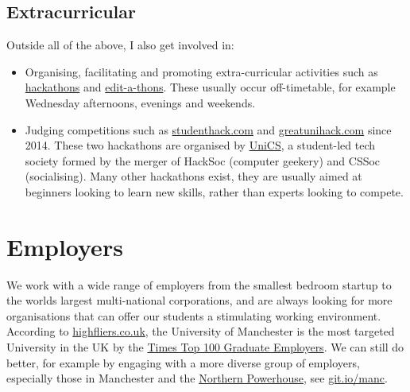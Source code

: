 \documentclass[
  12pt,
]{book}
\providecommand{\tightlist}{%
  \setlength{\itemsep}{0pt}\setlength{\parskip}{0pt}}
\begin{document}
\hypertarget{extracurricular}{%
\section{Extracurricular}\label{extracurricular}}

Outside all of the above, I also get involved in:

\begin{itemize}
\tightlist
\item
  Organising, facilitating and promoting extra-curricular activities such as \href{https://en.wikipedia.org/wiki/Hackathon}{hackathons} \citep{Briscoe, Warner2017} and \href{https://en.wikipedia.org/wiki/Edit-a-thon}{edit-a-thons}. \citep{goodbadugly, troubled, findingada2019} These usually occur off-timetable, for example Wednesday afternoons, evenings and weekends.
\item
  Judging competitions such as \href{https://www.studenthack.com}{studenthack.com} and \href{https://greatunihack.com}{greatunihack.com} since 2014. These two hackathons are organised by \href{https://www.unicsmcr.com/}{UniCS}, a student-led tech society formed by the merger of HackSoc (computer geekery) and CSSoc (socialising). Many other hackathons exist, they are usually aimed at beginners looking to learn new skills, rather than experts looking to compete. \citep{Briscoe, hafb}
\end{itemize}

\hypertarget{employers}{%
\chapter{Employers}\label{employers}}

We work with a wide range of employers from the smallest bedroom startup to the worlds largest multi-national corporations, and are always looking for more organisations that can offer our students a stimulating working environment. According to \href{https://www.highfliers.co.uk}{highfliers.co.uk}, the University of Manchester is the most targeted University in the UK by the \href{https://www.top100graduateemployers.com}{Times Top 100 Graduate Employers}. \citep{times100, highfliers2021, highfliers2020, Birchall2019} We can still do better, for example by engaging with a more diverse group of employers, especially those in Manchester and the \href{https://northernpowerhouse.gov.uk/}{Northern Powerhouse}, see \href{https://git.io/manc}{git.io/manc}. \citep{gitmanc, londonvstherest, hebdenbridge, manhattanchester, manchattan}
\end{document}
